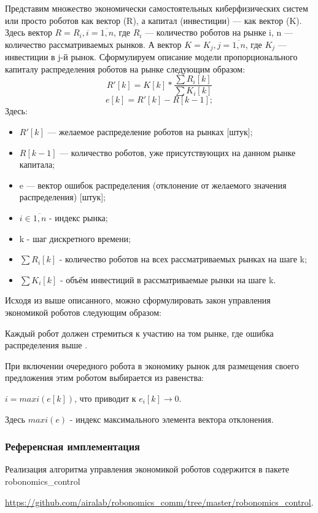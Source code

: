 \documentclass{article}
\begin{document}
Представим множество экономически самостоятельных киберфизических систем или просто роботов как вектор (R), а капитал (инвестиции) — как вектор (K). Здесь вектор $ R = {R_i, i=\overline{1,n}}$, где $R_i$ — количество роботов на рынке i, n — количество рассматриваемых рынков. А вектор $ K = {K_j, j=\overline{1,n}} $, где  $K_j$ — инвестиции в j-й рынок. Сформулируем описание модели пропорционального капиталу распределения роботов на рынке следующим образом:
\[
R'[k] = K[k] *  \frac{ \sum R_i[k]}{ \sum K_i[k] }
\]
\[
e[k] = R'[k] - R[k-1] ;
\]
Здесь:
\begin{itemize}
\item $R'[k]$ — желаемое распределение роботов на рынках [штук];
\item $R[k-1]$ — количество роботов, уже присутствующих на данном рынке капитала;
\item e — вектор ошибок распределения (отклонение от желаемого значения распределения) [штук];
\item $i \in \overline{1,n}$ - индекс рынка;
\item k - шаг дискретного времени;
\item $\sum R_i[k] $ - количество роботов на всех рассматриваемых рынках на шаге k;
\item $\sum K_i[k] $ - объём инвестиций в рассматриваемые рынки на шаге k.
\end{itemize}

Исходя из выше описанного, можно сформулировать закон управления экономикой роботов следующим образом:

Каждый робот должен стремиться к участию на том рынке, где ошибка распределения выше \cite{2017}.

При включении очередного робота в экономику рынок для размещения своего предложения этим роботом выбирается из равенства:

$ i = maxi(e[k])$, что приводит к $ e_i[k] \rightarrow 0 $.

Здесь  $ maxi(e) $ - индекс максимального элемента вектора отклонения. 

\subsubsection{Референсная имплементация}

Реализация алгоритма управления экономикой роботов содержится в пакете robonomics\_control

\url{https://github.com/airalab/robonomics_comm/tree/master/robonomics_control}. 
\end{document}
